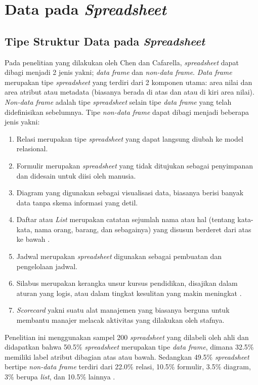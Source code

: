 \section{Data pada \textit{Spreadsheet}}

\subsection{Tipe Struktur Data pada \textit{Spreadsheet}}
Pada penelitian yang dilakukan oleh Chen dan Cafarella, \textit{spreadsheet} dapat dibagi menjadi 2 jenis yakni; \textit{data frame} dan \textit{non-data frame}. \textit{Data frame} merupakan tipe \textit{spreadsheet} yang terdiri dari 2 komponen utama: area nilai dan area atribut atau metadata (biasanya berada di atas dan atau di kiri area nilai). \textit{Non-data frame} adalah tipe \textit{spreadsheet} selain tipe \textit{data frame} yang telah didefinisikan sebelumnya. Tipe \textit{non-data frame} dapat dibagi menjadi beberapa jenis yakni:

    \begin{enumerate}
        \item Relasi merupakan tipe \textit{spreadsheet} yang dapat langsung diubah ke model relasional.
        \item Formulir merupakan \textit{spreadsheet} yang tidak ditujukan sebagai penyimpanan dan didesain untuk diisi oleh manusia.
        \item Diagram yang digunakan sebagai visualisasi data, biasanya berisi banyak data tanpa skema informasi yang detil.
        \item Daftar atau \textit{List} merupakan catatan sejumlah nama atau hal (tentang kata-kata, nama orang, barang, dan sebagainya) yang disusun berderet dari atas ke bawah \parencite{pusat1991kamus}.
        \item Jadwal merupakan \textit{spreadsheet} digunakan sebagai pembuatan dan pengelolaan jadwal.
        \item Silabus merupakan kerangka unsur kursus pendidikan, disajikan dalam aturan yang logis, atau dalam tingkat kesulitan yang makin meningkat \parencite{pusat1991kamus}.
        \item \textit{Scorecard} yakni suatu alat manajemen yang biasanya berguna untuk membantu manajer melacak aktivitas yang dilakukan oleh stafnya.
    \end{enumerate}

Penelitian ini menggunakan sampel 200 \textit{spreadsheet} yang dilabeli oleh ahli dan didapatkan bahwa 50.5\% \textit{spreadsheet} merupakan tipe \textit{data frame}, dimana 32.5\% memiliki label atribut dibagian atas atau bawah. Sedangkan 49.5\% \textit{spreadsheet} bertipe \textit{non-data frame} terdiri dari 22.0\% relasi, 10.5\% formulir, 3.5\% diagram, 3\% berupa \textit{list}, dan 10.5\% lainnya \parencite{Chen2013}.

